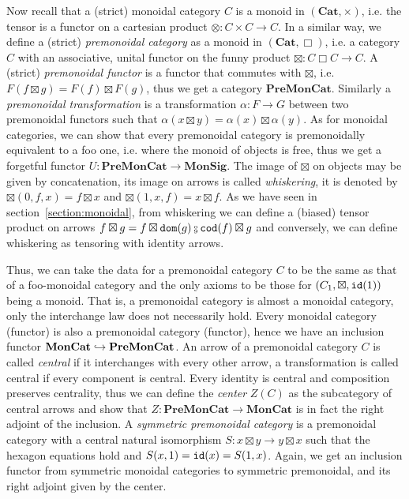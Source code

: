 Now recall that a (strict) monoidal category $C$ is a monoid in $(\mathbf{Cat}, \times)$, i.e. the tensor is a functor on a cartesian product $\otimes : C \times C \to C$.
In a similar way, we define a (strict) \emph{premonoidal category} as a monoid in $(\mathbf{Cat}, \Box)$, i.e. a category $C$ with an associative, unital functor on the funny product $\boxtimes : C \Box C \to C$.
A (strict) \emph{premonoidal functor} is a functor that commutes with $\boxtimes$, i.e. $F(f \boxtimes g) = F(f) \boxtimes F(g)$, thus we get a category $\mathbf{PreMonCat}$.
Similarly a \emph{premonoidal transformation} is a transformation $\alpha : F \to G$ between two premonoidal functors such that $\alpha(x \boxtimes y) = \alpha(x) \boxtimes \alpha(y)$.
As for monoidal categories, we can show that every premonoidal category is premonoidally equivalent to a foo one, i.e. where the monoid of objects is free, thus we get a forgetful functor $U : \mathbf{PreMonCat} \to \mathbf{MonSig}$.
The image of $\boxtimes$ on objects may be given by concatenation, its image on arrows is called \emph{whiskering}, it is denoted by $\boxtimes(0, f, x) = f \boxtimes x$ and $\boxtimes(1, x, f) = x \boxtimes f$.
As we have seen in section~\ref{section:monoidal}, from whiskering we can define a (biased) tensor product on arrows $f \boxtimes g = f \boxtimes \dom(g) \fcmp \cod(f) \boxtimes g$ and conversely, we can define whiskering as tensoring with identity arrows.

Thus, we can take the data for a premonoidal category $C$ to be the same as that of a foo-monoidal category and the only axioms to be those for $(C_1, \boxtimes, \mathtt{id}(1))$ being a monoid.
That is, a premonoidal category is almost a monoidal category, only the interchange law does not necessarily hold.
Every monoidal category (functor) is also a premonoidal category (functor), hence we have an inclusion functor $\mathbf{MonCat} \hookrightarrow \mathbf{PreMonCat}$.
An arrow of a premonoidal category $C$ is called \emph{central} if it interchanges with every other arrow, a transformation is called central if every component is central.
Every identity is central and composition preserves centrality, thus we can define the \emph{center} $Z(C)$ as the subcategory of central arrows and show that $Z : \mathbf{PreMonCat} \to \mathbf{MonCat}$ is in fact the right adjoint of the inclusion.
A \emph{symmetric premonoidal category} is a premonoidal category with a central natural isomorphism $S : x \boxtimes y \to y \boxtimes x$ such that the hexagon equations hold and $S(x, 1) = \mathtt{id}(x) = S(1, x)$.
Again, we get an inclusion functor from symmetric monoidal categories to symmetric premonoidal, and its right adjoint given by the center.

